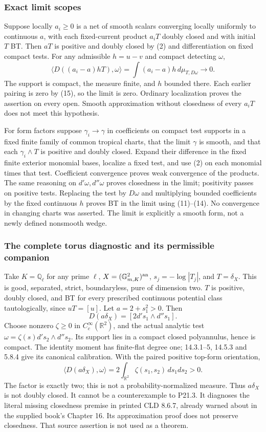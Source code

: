 \documentclass[11pt]{article}
\begin{document}
\subsubsection{Exact limit scopes}

Suppose locally \(a_i\geq0\) is a net of smooth scalars converging locally uniformly to continuous \(a\), with each fixed-current product \(a_iT\) doubly closed and with initial \(T\) BT. Then \(aT\) is positive and doubly closed by (2) and differentiation on fixed compact tests. For any admissible \(h=u-v\) and compact detecting \(\omega\),
\[
 \langle D((a_i-a)hT),\omega\rangle
 =\int(a_i-a)h\,d\mu_{T,D\omega}\longrightarrow0.
\]
The support is compact, the measure finite, and \(h\) bounded there. Each earlier pairing is zero by (15), so the limit is zero. Ordinary localization proves the assertion on every open. Smooth approximation without closedness of every \(a_iT\) does not meet this hypothesis.

For form factors suppose \(\gamma_i\to\gamma\) in coefficients on compact test supports in a fixed finite family of common tropical charts, that the limit \(\gamma\) is smooth, and that each \(\gamma_i\wedge T\) is positive and doubly closed. Expand their difference in the fixed finite exterior monomial bases, localize a fixed test, and use (2) on each monomial times that test. Coefficient convergence proves weak convergence of the products. The same reasoning on \(d'\omega,d''\omega\) proves closedness in the limit; positivity passes on positive tests. Replacing the test by \(D\omega\) and multiplying bounded coefficients by the fixed continuous \(h\) proves BT in the limit using (11)--(14). No convergence in changing charts was asserted. The limit is explicitly a smooth form, not a newly defined nonsmooth wedge.

\subsubsection{The complete torus diagnostic and its permissible companion}

Take \(K=\mathbb Q_\ell\) for any prime \(\ell\), \(X=(\mathbb G_{m,K}^2)^{\rm an}\), \(s_j=-\log|T_j|\), and \(T=\delta_X\). This is good, separated, strict, boundaryless, pure of dimension two. \(T\) is positive, doubly closed, and BT for every prescribed continuous potential class tautologically, since \(uT=[u]\). Let \(a=2+s_1^2>0\). Then
\[
 D(a\delta_X)=[2d's_1\wedge d''s_1].
\]
Choose nonzero \(\zeta\geq0\) in \(C_c^\infty(\mathbb R^2)\), and the actual analytic test \(\omega=\zeta(s)d's_2\wedge d''s_2\). Its support lies in a compact closed polyannulus, hence is compact. The identity moment has finite-flat degree one; 14.3.1--5, 14.5.3 and 5.8.4 give its canonical calibration. With the paired positive top-form orientation,
\[
 \langle D(a\delta_X),\omega\rangle
 =2\int_{\mathbb R^2}\zeta(s_1,s_2)\,ds_1ds_2>0.
\]
The factor is exactly two; this is not a probability-normalized measure. Thus \(a\delta_X\) is not doubly closed. It cannot be a counterexample to P21.3. It diagnoses the literal missing closedness premise in printed CLD 8.6.7, already warned about in the supplied book's Chapter 16. Its approximation proof does not preserve closedness. That source assertion is not used as a theorem.
\end{document}

